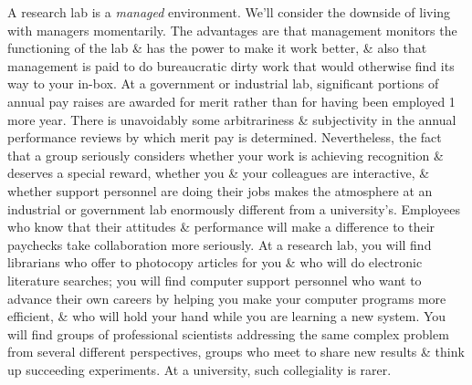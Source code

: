 \documentclass{article}
\begin{document}
\begin{enumerate}
\begin{itemize}
\begin{itemize}
			A research lab is a \textit{managed} environment. We'll consider the downside of living with managers momentarily. The advantages are that management monitors the functioning of the lab \& has the power to make it work better, \& also that management is paid to do bureaucratic dirty work that would otherwise find its way to your in-box. At a government or industrial lab, significant portions of annual pay raises are awarded for merit rather than for having been employed 1 more year. There is unavoidably some arbitrariness \& subjectivity in the annual performance reviews by which merit pay is determined. Nevertheless, the fact that a group seriously considers whether your work is achieving recognition \& deserves a special reward, whether you \& your colleagues are interactive, \& whether support personnel are doing their jobs makes the atmosphere at an industrial or government lab enormously different from a university's. Employees who know that their attitudes \& performance will make a difference to their paychecks take collaboration more seriously. At a research lab, you will find librarians who offer to photocopy articles for you \& who will do electronic literature searches; you will find computer support personnel who want to advance their own careers by helping you make your computer programs more efficient, \& who will hold your hand while you are learning a new system. You will find groups of professional scientists addressing the same complex problem from several different perspectives, groups who meet to share new results \& think up succeeding experiments. At a university, such collegiality is rarer.


\end{itemize}
\end{itemize}
\end{enumerate}
\end{document}
